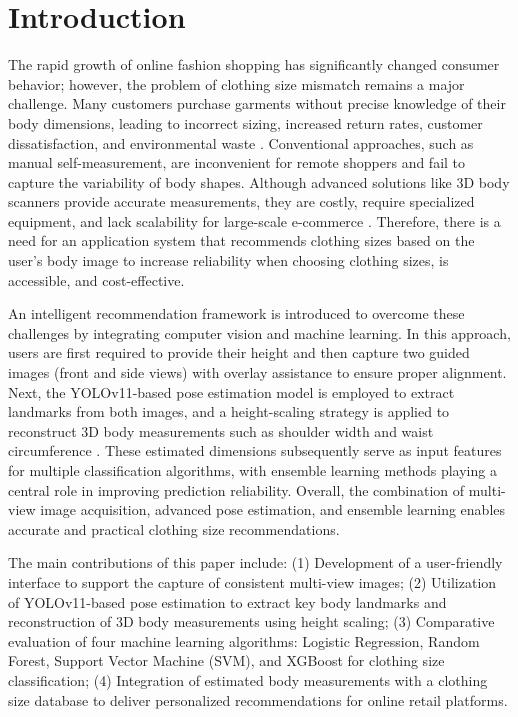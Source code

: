 \documentclass{llncs}
\begin{document}
\section{Introduction}

The rapid growth of online fashion shopping has significantly changed consumer behavior; however, the problem of clothing size mismatch remains a major challenge. 
Many customers purchase garments without precise knowledge of their body dimensions, leading to incorrect sizing, increased return rates, customer dissatisfaction, and environmental waste \cite{ref8}. 
Conventional approaches, such as manual self-measurement, are inconvenient for remote shoppers and fail to capture the variability of body shapes. 
Although advanced solutions like 3D body scanners provide accurate measurements, they are costly, require specialized equipment, and lack scalability for large-scale e-commerce \cite{ref2,ref26}. 
Therefore, there is a need for an application system that recommends clothing sizes based on the user's body image to increase reliability when choosing clothing sizes, 
    is accessible, and cost-effective.

An intelligent recommendation framework is introduced to overcome these challenges by integrating computer vision and machine learning. In this approach, users are first required to provide their height and then capture two guided images (front and side views) with overlay assistance to ensure proper alignment. Next, the YOLOv11-based pose estimation model is employed to extract landmarks from both images, and a height-scaling strategy is applied to reconstruct 3D body measurements such as shoulder width and waist circumference \cite{ref2}. These estimated dimensions subsequently serve as input features for multiple classification algorithms, with ensemble learning methods playing a central role in improving prediction reliability. Overall, the combination of multi-view image acquisition, advanced pose estimation, and ensemble learning enables accurate and practical clothing size recommendations.

The main contributions of this paper include: (1) Development of a user-friendly interface to support the capture of consistent multi-view images; 
(2) Utilization of YOLOv11-based pose estimation to extract key body landmarks and reconstruction of 3D body measurements using height scaling; 
(3) Comparative evaluation of four machine learning algorithms: Logistic Regression, Random Forest, Support Vector Machine (SVM), and XGBoost for clothing size classification; 
(4) Integration of estimated body measurements with a clothing size database to deliver personalized recommendations for online retail platforms.
\end{document}
